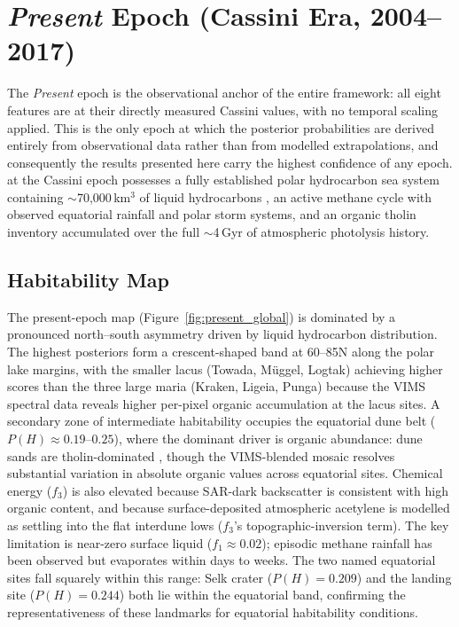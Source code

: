 \section{\textit{Present} Epoch (Cassini Era, 2004--2017)}
\label{sec:results_present}

The \textit{Present} epoch is the observational anchor of the entire framework: all eight features are at their directly measured Cassini values, with no temporal scaling applied.  This is the only epoch at which the posterior probabilities are derived entirely from observational data rather than from modelled extrapolations, and consequently the results presented here carry the highest confidence of any epoch.  \titan{} at the Cassini epoch possesses a fully established polar hydrocarbon sea system containing $\sim$70,000\,km$^3$ of liquid hydrocarbons \citep{Mastrogiuseppe2019,Malaska2025}, an active methane cycle with observed equatorial rainfall \citep{Turtle2011} and polar storm systems, and an organic tholin inventory accumulated over the full $\sim$4\,Gyr of atmospheric photolysis history.

\subsection{Habitability Map}
\label{sec:present_spatial}

The present-epoch map (Figure~\ref{fig:present_global}) is dominated by a pronounced north--south asymmetry driven by liquid hydrocarbon distribution.  The highest posteriors form a crescent-shaped band at 60--85\textdegree{}N along the polar lake margins, with the smaller lacus (Towada, Müggel, Logtak) achieving higher scores than the three large maria (Kraken, Ligeia, Punga) because the VIMS spectral data reveals higher per-pixel organic accumulation at the lacus sites.  A secondary zone of intermediate habitability occupies the equatorial dune belt ($P(H) \approx 0.19$--$0.25$), where the dominant driver is organic abundance: dune sands are tholin-dominated \citep{LeMouelic2019}, though the VIMS-blended mosaic resolves substantial variation in absolute organic values across equatorial sites.  Chemical energy ($f_3$) is also elevated because SAR-dark backscatter is consistent with high organic content, and because surface-deposited atmospheric acetylene \citep{Singh2016} is modelled as settling into the flat interdune lows ($f_3$'s topographic-inversion term).  The key limitation is near-zero surface liquid ($f_1 \approx 0.02$); episodic methane rainfall has been observed \citep{Turtle2011} but evaporates within days to weeks.  The two named equatorial sites fall squarely within this range: Selk crater ($P(H) = 0.209$) and the \huygens{} landing site ($P(H) = 0.244$) both lie within the equatorial band, confirming the representativeness of these landmarks for equatorial habitability conditions.

